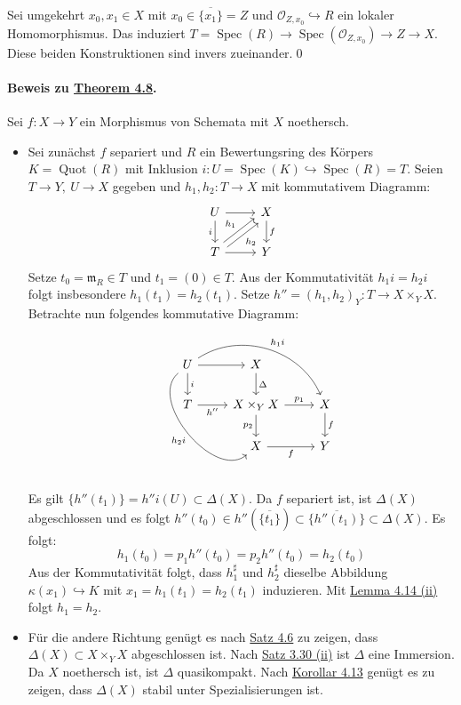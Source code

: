 Sei umgekehrt $x_0,x_1\in X$ mit $x_0\in\overline{\{x_1\}}= Z$ und $\mathcal{O}_{Z,x_0}\hookrightarrow R$ ein lokaler Homomorphismus. Das induziert $T=\operatorname{Spec}(R)\to\operatorname{Spec}(\mathcal{O}_{Z,x_0})\to Z\to X$. Diese beiden Konstruktionen sind invers zueinander.\qed

\paragraph{Beweis zu \hyperref[4.8]{Theorem 4.8}.} Sei $f:X\to Y$ ein Morphismus von Schemata mit $X$ noethersch.
\begin{itemize}
\item Sei zunächst $f$ separiert und $R$ ein Bewertungsring des Körpers $K=\operatorname{Quot}(R)$ mit Inklusion $i:U=\operatorname{Spec}(K)\hookrightarrow\operatorname{Spec}(R)=T$. Seien $T\to Y,\ U\to X$ gegeben und $h_1,h_2:T\to X$ mit kommutativem Diagramm:
\[\begin{tikzcd}
U\ar[d, "i"']\ar[r] & X\ar[d, "f"]\\
T\ar[r]\ar[ur, "h_1", shift left]\ar[ur, "h_2"', shift right] & Y
\end{tikzcd} \]
Setze $t_0=\mathfrak{m}_R\in T$ und $t_1=(0)\in T$. Aus der Kommutativität $h_1i=h_2i$ folgt insbesondere $h_1(t_1)=h_2(t_1)$. Setze $h''=(h_1,h_2)_Y:T\to X\times_Y X$. Betrachte nun folgendes kommutative Diagramm:
\[\begin{tikzcd}
U\ar[r]\ar[d, "i"]\ar[rdd, "h_2i"', bend right=90]\ar[rrd, "h_1i", bend left=50] & X\ar[d, "\Delta"] &\\
T\ar[r, "h''"'] & X\times_Y X\ar[r, "p_1"]\ar[d, "p_2"'] & X\ar[d, "f"]\\
& X\ar[r, "f"'] & Y
\end{tikzcd}\]
Es gilt $\{h''(t_1)\}= h''i(U)\subset\Delta(X)$. Da $f$ separiert ist, ist $\Delta(X)$ abgeschlossen und es folgt $h''(t_0)\in h''(\overline{\{t_1\}})\subset\overline{\{h''(t_1)\}}\subset\Delta(X)$. Es folgt:
\[h_1(t_0)=p_1h''(t_0)=p_2h''(t_0)=h_2(t_0) \]
Aus der Kommutativität folgt, dass $h_1^\sharp$ und $h_2^\sharp$ dieselbe Abbildung $\kappa(x_1)\hookrightarrow K$ mit $x_1=h_1(t_1)=h_2(t_1)$ induzieren. Mit \hyperref[4.14]{Lemma 4.14 (ii)} folgt $h_1=h_2$.
\item Für die andere Richtung genügt es nach \hyperref[4.6]{Satz 4.6} zu zeigen, dass $\Delta(X)\subset X\times_YX$ abgeschlossen ist. Nach \hyperref[3.30]{Satz 3.30 (ii)} ist $\Delta$ eine Immersion. Da $X$ noethersch ist, ist $\Delta$ quasikompakt. Nach \hyperref[4.13]{Korollar 4.13} genügt es zu zeigen, dass $\Delta(X)$ stabil unter Spezialisierungen ist.


\end{itemize}
